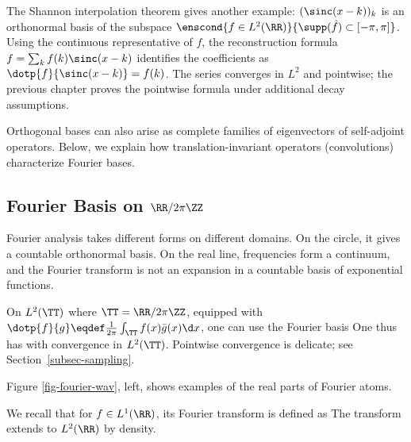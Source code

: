 The Shannon interpolation theorem gives another example: $( \sinc(x-k) )_k$ is an orthonormal basis of the subspace $\enscond{f\in L^2(\RR)}{\supp(\hat f) \subset [-\pi,\pi]}$. Using the continuous representative of $f$, the reconstruction formula $f=\sum_k f(k) \sinc(x-k)$ identifies the coefficients as $\dotp{f}{\sinc(x-k)} = f(k)$. The series converges in $L^2$ and pointwise; the previous chapter proves the pointwise formula under additional decay assumptions.


Orthogonal bases can also arise as complete families of eigenvectors of self-adjoint operators. Below, we explain how translation-invariant operators (convolutions) characterize Fourier bases.


                                                
\subsection{Fourier Basis on \texorpdfstring{$\RR/2\pi\ZZ$}{the Circle}}

Fourier analysis takes different forms on different domains. On the circle, it gives a countable orthonormal basis. On the real line, frequencies form a continuum, and the Fourier transform is not an expansion in a countable basis of exponential functions.

On $L^2(\TT)$ where $\TT=\RR/2\pi\ZZ$, equipped with $\dotp{f}{g} \eqdef \frac{1}{2\pi}\int_\TT f(x) \bar g(x) \d x$, one can use the Fourier basis 
One thus has
with convergence in $L^2(\TT)$. Pointwise convergence is delicate; see Section~\ref{subsec-sampling}.

Figure \ref{fig-fourier-wav}, left, shows examples of the real parts of Fourier atoms.



We recall that for $f \in L^1(\RR)$, its Fourier transform is defined as
The transform extends to $L^2(\RR)$ by density.

